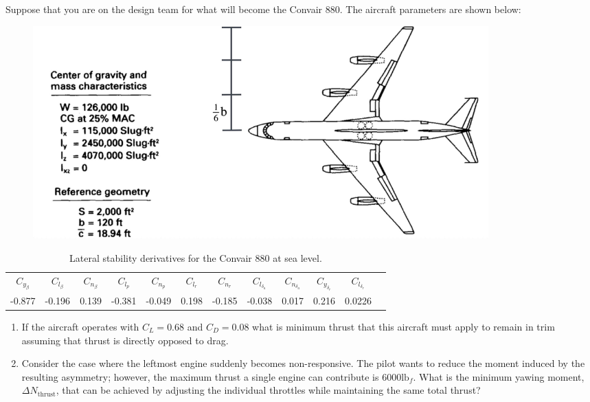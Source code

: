 \begin{question}
    Suppose that you are on the design team for what will become the Convair 880. The aircraft parameters are shown below:
\begin{figure}[htbp]
    \centering
    \includegraphics[width=0.85\textwidth]{figures/convair880.jpg}
\end{figure}
\begin{table}[htbp]
    \centering
    \caption{Lateral stability derivatives for the Convair 880 at sea level.}
    \begin{tabular}{cccccccccccc} %
        \toprule
$C_{y_\beta}$ & $C_{l_\beta}$ & $C_{n_\beta}$ & $C_{l_p}$ & $C_{n_p}$ & $C_{l_r}$ & $C_{n_r}$ & $C_{l_{\delta_a}}$ & $C_{n_{\delta_a}}$ & $C_{y_{\delta_r}}$ & $C_{l_{\delta_r}}$ \\ %
-0.877 & -0.196 & 0.139 & -0.381 & -0.049 & 0.198 & -0.185 & -0.038 & 0.017 & 0.216 & 0.0226 \\ %
    \bottomrule
    \end{tabular}
\end{table}

\begin{enumerate}[label=\alph*)]
    \item If the aircraft operates with $C_L = 0.68$ and $C_D = 0.08$ what is minimum thrust that this aircraft must apply to remain in trim assuming that thrust is directly opposed to drag.
    
    \item Consider the case where the leftmost engine suddenly becomes non-responsive. The pilot wants to reduce the moment induced by the resulting asymmetry; however, the maximum thrust a single engine can contribute is $6000 \text{lb}_f$. What is the minimum yawing moment, $\Delta N_\text{thrust}$, that can be achieved by adjusting the individual throttles while maintaining the same total thrust? 


\end{enumerate}
\end{question}
